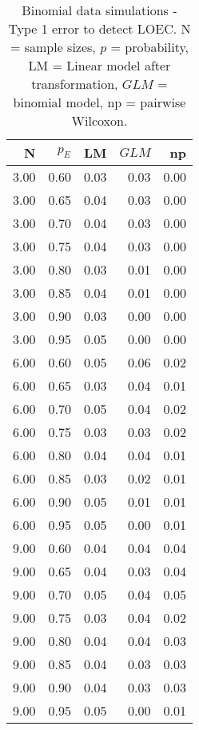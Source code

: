\begin{table}[H]
\centering
\caption{Binomial data simulations - Type 1 error to detect LOEC. N = sample sizes, 
             $p$ = probability, LM = Linear model after transformation, 
             $GLM$ = binomial model, np = pairwise Wilcoxon.} 
\label{tab:t1_loec_p}
{\footnotesize
\begin{tabular}{rrrrr}
  \hline
N & $p_E$ & LM & $GLM$ & np \\ 
  \hline
3.00 & 0.60 & 0.03 & 0.03 & 0.00 \\ 
  3.00 & 0.65 & 0.04 & 0.03 & 0.00 \\ 
  3.00 & 0.70 & 0.04 & 0.03 & 0.00 \\ 
  3.00 & 0.75 & 0.04 & 0.03 & 0.00 \\ 
  3.00 & 0.80 & 0.03 & 0.01 & 0.00 \\ 
  3.00 & 0.85 & 0.04 & 0.01 & 0.00 \\ 
  3.00 & 0.90 & 0.03 & 0.00 & 0.00 \\ 
  3.00 & 0.95 & 0.05 & 0.00 & 0.00 \\ 
  6.00 & 0.60 & 0.05 & 0.06 & 0.02 \\ 
  6.00 & 0.65 & 0.03 & 0.04 & 0.01 \\ 
  6.00 & 0.70 & 0.05 & 0.04 & 0.02 \\ 
  6.00 & 0.75 & 0.03 & 0.03 & 0.02 \\ 
  6.00 & 0.80 & 0.04 & 0.04 & 0.01 \\ 
  6.00 & 0.85 & 0.03 & 0.02 & 0.01 \\ 
  6.00 & 0.90 & 0.05 & 0.01 & 0.01 \\ 
  6.00 & 0.95 & 0.05 & 0.00 & 0.01 \\ 
  9.00 & 0.60 & 0.04 & 0.04 & 0.04 \\ 
  9.00 & 0.65 & 0.04 & 0.03 & 0.04 \\ 
  9.00 & 0.70 & 0.05 & 0.04 & 0.05 \\ 
  9.00 & 0.75 & 0.03 & 0.04 & 0.02 \\ 
  9.00 & 0.80 & 0.04 & 0.04 & 0.03 \\ 
  9.00 & 0.85 & 0.04 & 0.03 & 0.03 \\ 
  9.00 & 0.90 & 0.04 & 0.03 & 0.03 \\ 
  9.00 & 0.95 & 0.05 & 0.00 & 0.01 \\ 
   \hline
\end{tabular}
}
\end{table}
